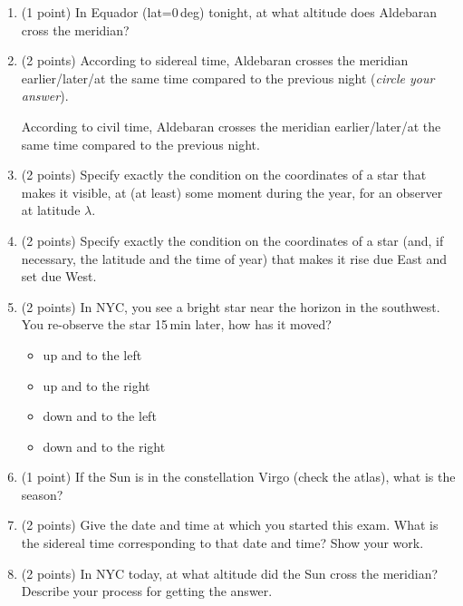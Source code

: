 \documentclass[12pt]{article}
\begin{document}
\begin{enumerate}
\item (1 point)
In Equador (lat=$0$\,deg) tonight, at what altitude does
Aldebaran cross the meridian?

\vspace{0.5in}

\item (2 points)
According to sidereal time, Aldebaran crosses the meridian
earlier/later/at the same time compared to the previous night
(\emph{circle your answer}).

According to civil time, Aldebaran crosses the meridian
earlier/later/at the same time compared to the previous night.

\item (2 points)
Specify exactly the condition on the coordinates of a star that makes
it visible, at (at least) some moment during the year, for an observer
at latitude $\lambda$.

\vspace{1in}

\item (2 points)
Specify exactly the condition on the coordinates of a star (and, if
necessary, the latitude and the time of year) that makes it rise due
East and set due West.

\vspace{1in}

\item (2 points)
In NYC, you see a bright star near the horizon in the southwest.  You
re-observe the star 15\,min later, how has it moved?
\begin{itemize}
\item up and to the left
\item up and to the right
\item down and to the left
\item down and to the right
\end{itemize}

\item (1 point)
If the Sun is in the constellation Virgo (check the atlas), what is
the season?

\vspace{0.5in}

\item (2 points)
Give the date and time at which you started this exam.  What is the
sidereal time corresponding to that date and time?  Show your work.

\vspace{1in}

\item (2 points)
In NYC today, at what altitude did the Sun cross the meridian?
Describe your process for getting the answer.


\end{enumerate}
\end{document}
